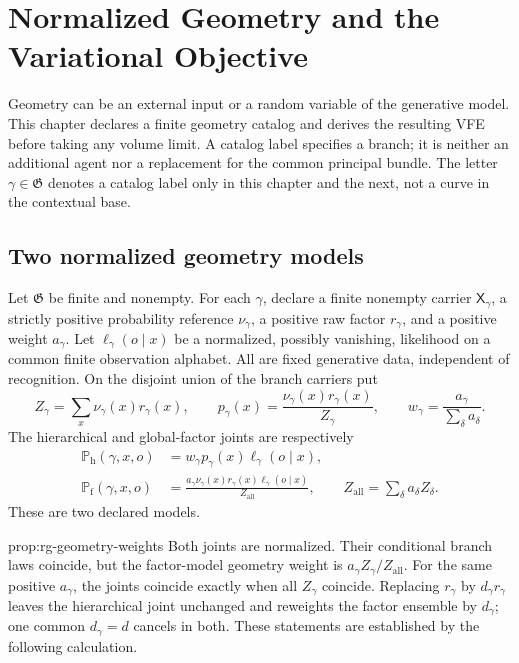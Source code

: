 \chapter{Normalized Geometry and the Variational Objective}
\label{ch:normalized-geometry}

Geometry can be an external input or a random variable of the generative
model. This chapter declares a finite geometry catalog and derives the
resulting VFE before taking any volume limit. A catalog label specifies a
branch; it is neither an additional agent nor a replacement for the common
principal bundle. The letter $\gamma\in\mathfrak G$ denotes a catalog label
only in this chapter and the next, not a curve in the contextual base.

\section{Two normalized geometry models}
\label{sec:rg-geometry-normalization}

Let $\mathfrak G$ be finite and nonempty. For each $\gamma$, declare a finite
nonempty carrier $\mathsf X_\gamma$, a strictly positive probability reference
$\nu_\gamma$, a positive raw factor $r_\gamma$, and a positive weight
$a_\gamma$. Let $\ell_\gamma(o\mid x)$ be a normalized, possibly vanishing,
likelihood on a common finite observation alphabet. All are fixed generative
data, independent of recognition. On the disjoint union of the branch
carriers put
\begin{equation}
 Z_\gamma=\sum_x\nu_\gamma(x)r_\gamma(x),\qquad
 p_\gamma(x)=\frac{\nu_\gamma(x)r_\gamma(x)}{Z_\gamma},\qquad
 w_\gamma=\frac{a_\gamma}{\sum_\delta a_\delta}.
 \label{eq:rg-geometry-branch}
\end{equation}
The hierarchical and global-factor joints are respectively
\begin{align}
 \mathbb P_{\mathrm h}(\gamma,x,o)
 &=w_\gamma p_\gamma(x)\ell_\gamma(o\mid x),
 \label{eq:rg-geometry-hierarchy}\\
 \mathbb P_{\mathrm f}(\gamma,x,o)
 &=\frac{a_\gamma\nu_\gamma(x)r_\gamma(x)
              \ell_\gamma(o\mid x)}{Z_{\mathrm{all}}},\qquad
 Z_{\mathrm{all}}=\sum_\delta a_\delta Z_\delta.
 \label{eq:rg-geometry-factor}
\end{align}
These are two declared models. 

{prop:rg-geometry-weights}
Both joints are normalized. Their conditional branch laws coincide, but the
factor-model geometry weight is $a_\gamma Z_\gamma/Z_{\mathrm{all}}$.
For the same positive $a_\gamma$, the joints coincide exactly when all
$Z_\gamma$ coincide. Replacing $r_\gamma$ by $d_\gamma r_\gamma$ leaves
the hierarchical joint unchanged and reweights the factor ensemble by
$d_\gamma$; one common $d_\gamma=d$ cancels in both. These statements are
established by the following calculation. 

